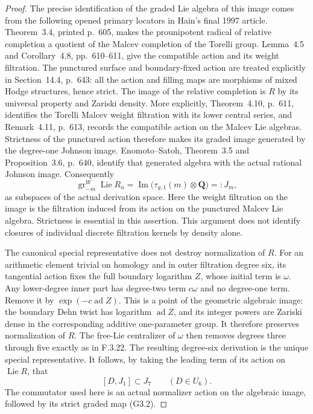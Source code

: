 \begin{proof}
The precise identification of the graded Lie algebra
of this image comes from the following opened primary
locators in Hain's final 1997 article\cite{AuditHain1997Torelli}. Theorem~3.4,
printed p.~605, makes the prounipotent radical of
relative completion a quotient of the Malcev
completion of the Torelli group. Lemma~4.5 and
Corollary~4.8, pp.~610--611, give the compatible
action and its weight filtration. The punctured
surface and boundary-fixed action are treated
explicitly in Section~14.4, p.~643: all the action
and filling maps are morphisms of mixed Hodge
structures, hence strict. The image of the relative
completion is $R$ by its universal property and
Zariski density. More explicitly, Theorem~4.10,
p.~611, identifies the Torelli Malcev weight
filtration with its lower central series, and
Remark~4.11, p.~613, records the compatible action
on the Malcev Lie algebras. Strictness of the
punctured action therefore makes its graded image
generated by the degree-one Johnson image.
Enomoto--Satoh, Theorem~3.5 and Proposition~3.6,
p.~640, identify that generated algebra with
the actual rational Johnson image. Consequently
\[
 \operatorname{gr}_{-m}^W\operatorname{Lie}R_u
   =\operatorname{Im}\bigl(\tau_{g,1}(m)\otimes\mathbf Q\bigr)
   =:J_m,                                                  \tag{G3.2}
\]
as subspaces of the actual derivation space. Here the
weight filtration on the image is the filtration
induced from its action on the punctured Malcev Lie
algebra. Strictness is essential in this assertion.
This argument does not identify closures of individual
discrete filtration kernels by density alone.

The canonical special representative does not destroy
normalization of $R$. For an arithmetic element trivial
on homology and in outer filtration degree six, its
tangential action fixes the full boundary logarithm
$Z$, whose initial term is $\omega$. Any lower-degree
inner part has degree-two term $c\omega$ and no
degree-one term. Remove it by $\exp(-c\operatorname{ad}Z)$.
This is a point of the geometric algebraic image: the
boundary Dehn twist has logarithm
$\operatorname{ad}Z$, and its integer powers are
Zariski dense in the corresponding additive one-parameter
group. It therefore preserves normalization of $R$.
The free-Lie centralizer of $\omega$ then removes
degrees three through five exactly as in F.3.22.
The resulting degree-six derivation is the unique
special representative. It follows, by taking the
leading term of its action on $\operatorname{Lie}R$, that
\[
                       [D,J_1]\subset J_7
                       \qquad(D\in U_6).                  \tag{G3.3}
\]
The commutator used here is an actual normalizer action
on the algebraic image, followed by its strict graded
map (G3.2).


\end{proof}
